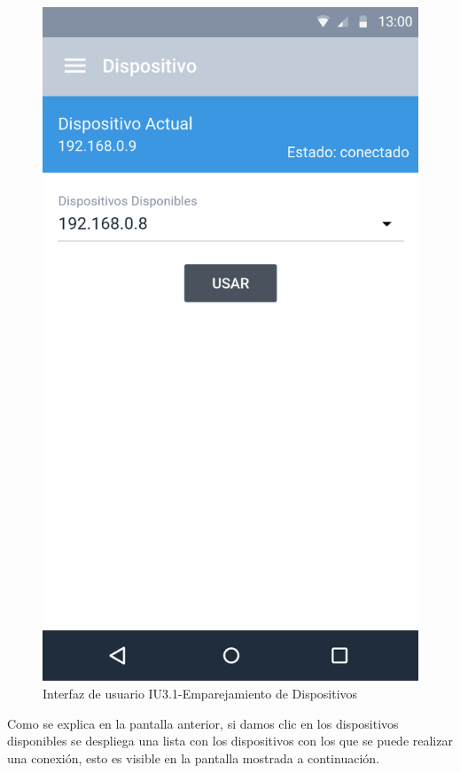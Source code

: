 \begin{figure}[H]
	\centering
	\includegraphics[scale=0.70]{Capitulo4/software/submodulos/images/dispositivos.png}
	\caption{Interfaz de usuario IU3.1-Emparejamiento de Dispositivos}
	\label{fig:Emparejamiento Dispositivo}
\end{figure}

Como se explica en la pantalla anterior, si damos clic en los dispositivos disponibles se despliega una lista con los dispositivos con los que se puede realizar una conexión, esto es visible en la pantalla mostrada a continuación.

